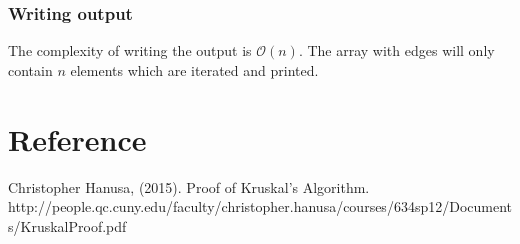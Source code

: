 \documentclass{article}
\newcommand{\bigO}[1]{\mathcal{O}(#1)}
\begin{document}
\subsubsection{Writing output}
The complexity of writing the output is $\bigO{n}$. The array with edges will only contain $n$ elements which are iterated and printed.

\section{Reference}

Christopher Hanusa, (2015). Proof of Kruskal’s Algorithm. \newline
http://people.qc.cuny.edu/faculty/christopher.hanusa/courses/634sp12/Documents/KruskalProof.pdf
\end{document}
